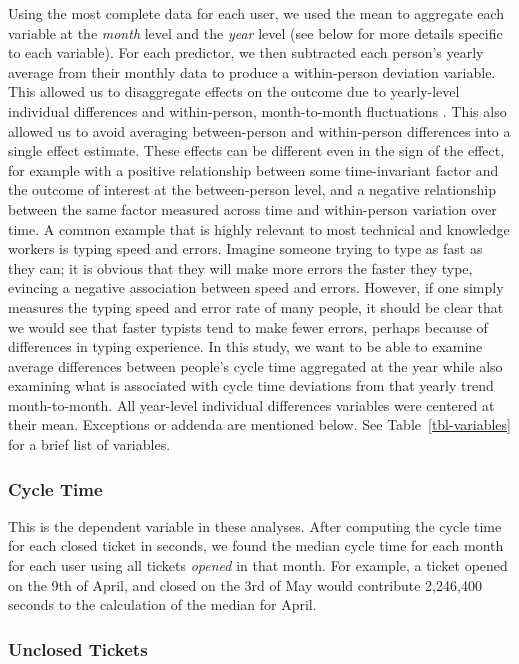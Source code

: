 \documentclass[
  sn-mathphys-ay,
]{sn-jnl}
\begin{document}
Using the most complete data for each user, we used the mean to
aggregate each variable at the \emph{month} level and the \emph{year}
level (see below for more details specific to each variable). For each
predictor, we then subtracted each person's yearly average from their
monthly data to produce a within-person deviation variable. This allowed
us to disaggregate effects on the outcome due to yearly-level individual
differences and within-person, month-to-month fluctuations
\citep{curranDisaggregationPersonPerson2011}. This also allowed us to
avoid averaging between-person and within-person differences into a
single effect estimate. These effects can be different even in the sign
of the effect, for example with a positive relationship between some
time-invariant factor and the outcome of interest at the between-person
level, and a negative relationship between the same factor measured
across time and within-person variation over time. A common example that
is highly relevant to most technical and knowledge workers is typing
speed and errors. Imagine someone trying to type as fast as they can; it
is obvious that they will make more errors the faster they type,
evincing a negative association between speed and errors. However, if
one simply measures the typing speed and error rate of many people, it
should be clear that we would see that faster typists tend to make fewer
errors, perhaps because of differences in typing experience. In this
study, we want to be able to examine average differences between
people's cycle time aggregated at the year while also examining what is
associated with cycle time deviations from that yearly trend
month-to-month. All year-level individual differences variables were
centered at their mean. Exceptions or addenda are mentioned below. See
Table~\ref{tbl-variables} for a brief list of variables.

\subsubsection{Cycle Time}\label{cycle-time-1}

This is the dependent variable in these analyses. After computing the
cycle time for each closed ticket in seconds, we found the median cycle
time for each month for each user using all tickets \emph{opened} in
that month. For example, a ticket opened on the 9th of April, and closed
on the 3rd of May would contribute 2,246,400 seconds to the calculation
of the median for April.

\subsubsection{Unclosed Tickets}\label{unclosed-tickets}
\end{document}
